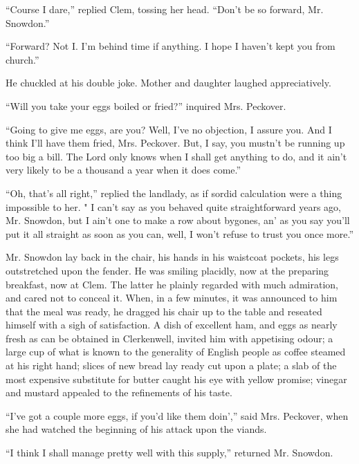 ``Course I dare,'' replied Clem, tossing her head. ``Don't be so
forward, Mr. Snowdon.''

``Forward? Not I. I'm behind time if anything. I hope I haven't kept you
from church.''

He chuckled at his double joke. Mother and daughter laughed
appreciatively.

``Will you take your eggs boiled or fried?'' inquired Mrs. Peckover.

``Going to give me eggs, are you? Well, I've no objection, I assure you.
And I think I'll have them fried, Mrs. Peckover. But, I say, you mustn't
be running up too big a bill. The Lord only knows when I shall get
anything to do, and it ain't very likely to be a thousand a year when it
does come.''

``Oh, that's all right,'' replied the landlady, as if sordid calculation
were a thing impossible to her. " I can't say as you behaved quite
straightforward years ago, Mr. Snowdon, but I ain't one to make a row
about bygones, {}an' as you say you'll put it all straight as soon as
you can, well, I won't refuse to trust you once more.''

Mr. Snowdon lay back in the chair, his hands in his waistcoat pockets,
his legs outstretched upon the fender. He was smiling placidly, now at
the preparing breakfast, now at Clem. The latter he plainly regarded
with much admiration, and cared not to conceal it. When, in a few
minutes, it was announced to him that the meal was ready, he dragged his
chair up to the table and reseated himself with a sigh of satisfaction.
A dish of excellent ham, and eggs as nearly fresh as can be obtained in
Clerkenwell, invited him with appetising odour; a large cup of what is
known to the generality of English people as coffee steamed at his right
hand; slices of new bread lay ready cut upon a plate; a slab of the most
expensive substitute for butter caught his eye with yellow promise;
vinegar and mustard appealed to the refinements of his taste.

``I've got a couple more eggs, if you'd like {}them doin','' said Mrs.
Peckover, when she had watched the beginning of his attack upon the
viands.

``I think I shall manage pretty well with this supply,'' returned Mr.
Snowdon.

